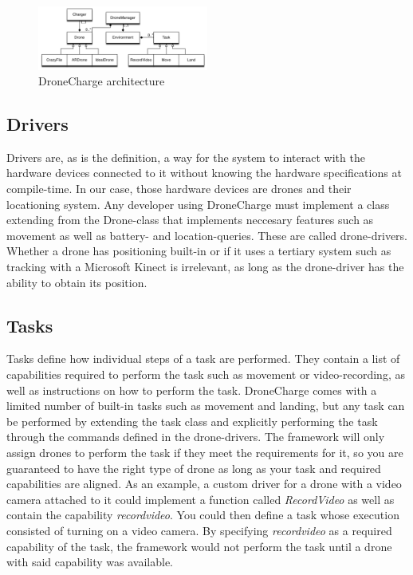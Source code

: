 \begin{figure}[h]
\begin{center}
\includegraphics[width=0.5\textwidth]{images/dronechargearchitecture.png}
\caption{DroneCharge architecture}
\label{fig:architecturefig}
\end{center}
\end{figure}

\subsection{Drivers}
Drivers are, as is the definition, a way for the system to interact with the hardware devices connected to it without knowing the hardware specifications at compile-time. In our case, those hardware devices are drones and their locationing system. Any developer using DroneCharge must implement a class extending from the Drone-class that implements neccesary features such as movement as well as battery- and location-queries. These are called drone-drivers. Whether a drone has positioning built-in or if it uses a tertiary system such as tracking with a Microsoft Kinect is irrelevant, as long as the drone-driver has the ability to obtain its position.

\subsection{Tasks}
Tasks define how individual steps of a task are performed. They contain a list of capabilities required to perform the task such as movement or video-recording, as well as instructions on how to perform the task. DroneCharge comes with a limited number of built-in tasks such as movement and landing, but any task can be performed by extending the task class and explicitly performing the task through the commands defined in the drone-drivers. The framework will only assign drones to perform the task if they meet the requirements for it, so you are guaranteed to have the right type of drone as long as your task and required capabilities are aligned. As an example, a custom driver for a drone with a video camera attached to it could implement a function called \textit{RecordVideo} as well as contain the capability \textit{recordvideo}. You could then define a task whose execution consisted of turning on a video camera. By specifying \textit{recordvideo} as a required capability of the task, the framework would not perform the task until a drone with said capability was available.
